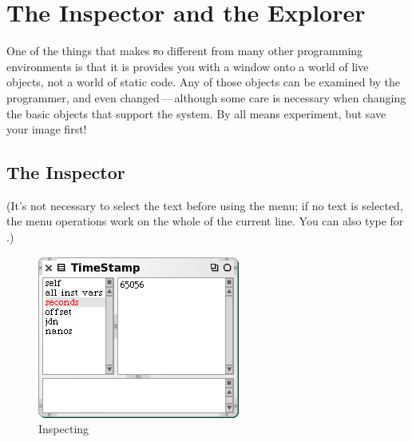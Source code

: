 \documentclass[a4paper,10pt,twoside]{book}
\begin{document}
\section{The Inspector and the Explorer}
\label{sec:inspector} %

One of the things that makes \st so different from many other programming environments is that it is provides you with a window onto a world of live objects, not a world of static code.
Any of those objects can be examined by the programmer, and even changed\,---\,although some care is necessary when changing the basic objects that support the system.  
By all means experiment, but save your image first!

\subsection{The Inspector}

(It's not necessary to select the text before using the menu; if no text is selected, the menu operations work on the whole of the current line.
You can also type  for .)

\begin{figure}[btp]
	\begin{center}
		\includegraphics[scale=0.65]{inspectTimeNow1}
	\end{center}
	\caption{Inspecting }
	\label{fig:inspectTimeNow1}
\end{figure}
\end{document}
